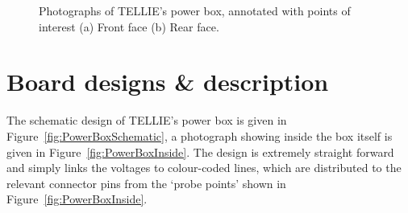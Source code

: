 \documentclass[12pt]{report}
\begin{document}
\begin{figure}
	\centering
	\newline
	\caption{Photographs of TELLIE's power box, annotated with points of interest (a) Front face (b) Rear face.}
	\label{fig:PowerBoxAnnotations} 
\end{figure}


\section{Board designs \& description}
The schematic design of TELLIE's power box is given in Figure~\ref{fig:PowerBoxSchematic}, a photograph showing inside the box itself is given in Figure~\ref{fig:PowerBoxInside}. The design is extremely straight forward and simply links the voltages to colour-coded lines, which are distributed to the relevant connector pins from the `probe points' shown in Figure~\ref{fig:PowerBoxInside}.
\end{document}
